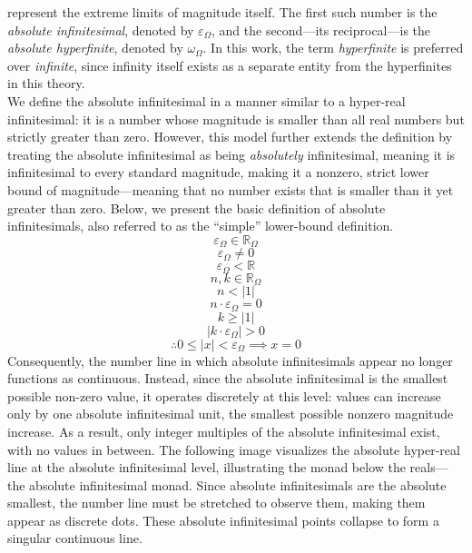 \documentclass{article}
\begin{document}
represent the extreme limits of magnitude itself. The first such number is the \emph{absolute infinitesimal}, denoted by $\varepsilon_\Omega$, and the second---its reciprocal---is the \emph{absolute hyperfinite}, denoted by $\omega_\Omega$. In this work, the term \emph{hyperfinite} is preferred over \emph{infinite}, since infinity itself exists as a separate entity from the hyperfinites in this theory.\\We define the absolute infinitesimal in a manner similar to a hyper-real infinitesimal: it is a number whose magnitude is smaller than all real numbers but strictly greater than zero. However, this model further extends the definition by treating the absolute infinitesimal as being \textit{absolutely} infinitesimal, meaning it is infinitesimal to every standard magnitude, making it a nonzero, strict lower bound of magnitude---meaning that no number exists that is smaller than it yet greater than zero. Below, we present the basic definition of absolute infinitesimals, also referred to as the ``simple'' lower-bound definition.
  $$\varepsilon_\Omega\in\mathbb{R}_\Omega$$ $$\varepsilon_\Omega\neq0$$ $$\varepsilon_\Omega<\mathbb{R}$$  $$n,k\in\mathbb{R}_\Omega$$ $$n<|1|$$ $$n\cdot\varepsilon_\Omega=0$$ $$k\ge|1|$$ $$|k\cdot\varepsilon_\Omega|>0$$ $$\therefore 0 \le |x| < \varepsilon_\Omega \implies x = 0
$$ Consequently, the number line in which absolute infinitesimals appear no longer functions as continuous. Instead, since the absolute infinitesimal is the smallest possible non-zero value, it operates discretely at this level: values can increase only by one absolute infinitesimal unit, the smallest possible nonzero magnitude increase. As a result, only integer multiples of the absolute infinitesimal exist, with no values in between. The following image visualizes the absolute hyper-real line at the absolute infinitesimal level, illustrating the monad below the reals—the absolute infinitesimal monad. Since absolute infinitesimals are the absolute smallest, the number line must be stretched to observe them, making them appear as discrete dots. These absolute infinitesimal points collapse to form a singular continuous line.
\end{document}
